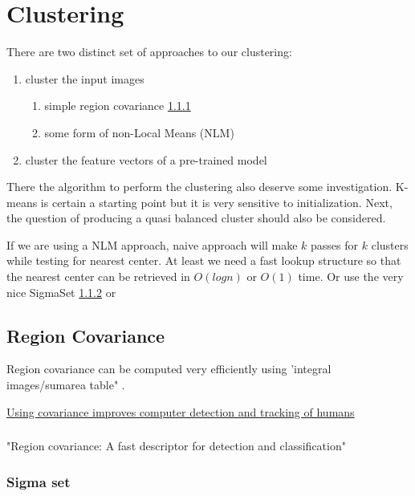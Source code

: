 \newpage
\section{Clustering}
There are two distinct set of approaches to our clustering:
\begin{enumerate}
\item cluster the input images
  \begin{enumerate}
   \item simple region covariance \ref{regcov}
   \item some form of non-Local Means (NLM)
\end{enumerate}
\item cluster the feature vectors of a pre-trained model
\end{enumerate}

There the algorithm to perform the clustering also deserve some investigation.
K-means is certain a starting point but it is very sensitive to initialization.
Next, the question of producing a quasi balanced cluster should also be considered.

If we are using a NLM approach, naive approach will make $k$ passes for $k$ clusters
while testing for nearest center. At least we need a fast lookup structure so 
that the nearest center can be retrieved in $O(logn)$ or $O(1)$ time.
Or use the very nice SigmaSet \ref{sigmaset} or \cite{Kwatra2010}

\subsection{Region Covariance}
Region covariance can be computed very efficiently using 'integral images/sumarea table" \cite{Porikli2006}.

\href{https://spie.org/news/0368-using-covariance-improves-computer-detection-and-tracking-of-humans?SSO=1}{Using covariance improves computer detection and tracking of humans}

\subsubsection{\cite{Tuzel2006}}\label{regcov}
"Region covariance: A fast descriptor for detection and classification"

\subsubsection{Sigma set}\label{sigmaset}
\cite{Chang2009} 

